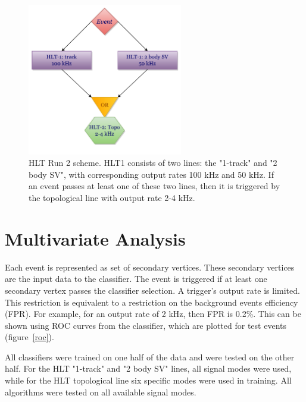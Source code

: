 \documentclass[a4paper]{jpconf}
\begin{document}
\begin{figure}[h]
\includegraphics[width=16pc]{../images/scheme.pdf}\hspace{2pc}%
\begin{minipage}[b]{20pc}\caption{\label{scheme} HLT Run 2 scheme. HLT1 consists of two lines: the "1-track" and "2 body SV", with corresponding output rates 100 kHz and 50 kHz. If an event passes at least one of these two lines, then it is triggered by the topological line with output rate 2-4 kHz.}
\end{minipage}
\end{figure}

\section{Multivariate Analysis}
Each event is represented as set of secondary vertices. These secondary vertices are the input data to the classifier.  The event is triggered if at least one secondary vertex passes the classifier selection. A trigger's output rate is limited. This restriction is equivalent to a restriction on the background events efficiency (FPR). For example, for an output rate of 2 kHz, then FPR is 0.2\%. This can be shown using ROC curves from the classifier, which are plotted for test events (figure~\ref{roc}).

All classifiers were trained on one half of the data and were tested on the other half. For the HLT "1-track" and "2 body SV" lines, all signal modes were used, while for the HLT topological line six specific modes were used in training.  All algorithms were tested on all available signal modes.
\end{document}
